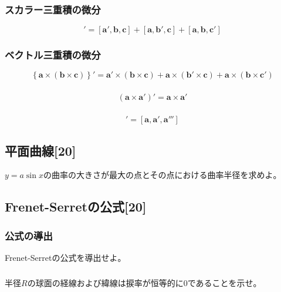 \documentclass[a4j,dvipdfmx]{jsarticle}
\begin{document}
            \subsubsection{スカラー三重積の微分}
                \begin{equation*}
                    [\bm{a},\bm{b},\bm{c}]'=[\bm{a}',\bm{b},\bm{c}]+[\bm{a},\bm{b}',\bm{c}]+[\bm{a},\bm{b},\bm{c}']
                \end{equation*}
            \subsubsection{ベクトル三重積の微分}
                \begin{equation*}
                    \left\{\bm{a}\times(\bm{b}\times\bm{c})\right\}' = \bm{a}'\times(\bm{b}\times\bm{c}) + \bm{a}\times(\bm{b}'\times\bm{c}) + \bm{a}\times(\bm{b}\times\bm{c}') 
                \end{equation*}
            \subsubsection{}
                \begin{equation*}
                    (\bm{a}\times\bm{a}')' = \bm{a}\times\bm{a}'
                \end{equation*}
            \subsubsection{}
                \begin{equation*}
                    [\bm{a},\bm{a}',\bm{a}'']' = [\bm{a},\bm{a}',\bm{a}''']
                \end{equation*}
        \clearpage
        \subsection{平面曲線[20]}
            $y=a\sin x$の曲率の大きさが最大の点とその点における曲率半径を求めよ。
        \subsection{Frenet-Serretの公式[20]}
            \subsubsection{公式の導出}
                Frenet-Serretの公式を導出せよ。        
            \subsubsection{}
                半径$R$の球面の経線および緯線は捩率が恒等的に0であることを示せ。
\end{document}
